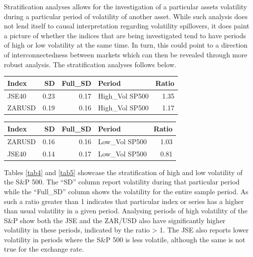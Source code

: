 \documentclass[11pt,preprint, authoryear]{elsarticle}
\let\origtable\table
\let\endorigtable\endtable
\renewenvironment{table}[1][2] {
    \expandafter\origtable\expandafter[H]
} {
    \endorigtable
}
\numberwithin{equation}{section}
\numberwithin{figure}{section}
\numberwithin{table}{section}
\begin{document}
Stratification analyses allows for the investigation of a particular
assets volatility during a particular period of volatility of another
asset. While such analysis does not lend itself to causal interpretation
regarding volatility spillovers, it does paint a picture of whether the
indices that are being investigated tend to have periods of high or low
volatility at the same time. In turn, this could point to a direction of
interconnectedness between markets which can then be revealed through
more robust analysis. The stratification analyses follows below.

\begin{table}[H]
\centering
\caption{S\&P 500 High Volatility \label{tab4}} 
\begin{tabular}{lrrlr}
  \hline
Index & SD & Full\_SD & Period & Ratio \\ 
  \hline
JSE40 & 0.23 & 0.17 & High\_Vol SP500 & 1.35 \\ 
  ZARUSD & 0.19 & 0.16 & High\_Vol SP500 & 1.17 \\ 
   \hline
\end{tabular}
\end{table}
\begin{table}[H]
\centering
\caption{S\&P 500 Low Volatility \label{tab5}} 
\begin{tabular}{lrrlr}
  \hline
Index & SD & Full\_SD & Period & Ratio \\ 
  \hline
ZARUSD & 0.16 & 0.16 & Low\_Vol SP500 & 1.03 \\ 
  JSE40 & 0.14 & 0.17 & Low\_Vol SP500 & 0.81 \\ 
   \hline
\end{tabular}
\end{table}

Tables \ref{tab4} and \ref{tab5} showcase the stratification of high and
low volatility of the S\&P 500. The ``SD'' column report volatility
during that particular period while the ``Full\_SD'' column shows the
volatility for the entire sample period. As such a ratio greater than 1
indicates that particular index or series has a higher than usual
volatility in a given period. Analysing periods of high volatility of
the S\&P show both the JSE and the ZAR/USD also have significantly
higher volatility in these periods, indicated by the ratio
\textgreater{} 1. The JSE also reports lower volatility in periods where
the S\&P 500 is less volatile, although the same is not true for the
exchange rate.
\end{document}
